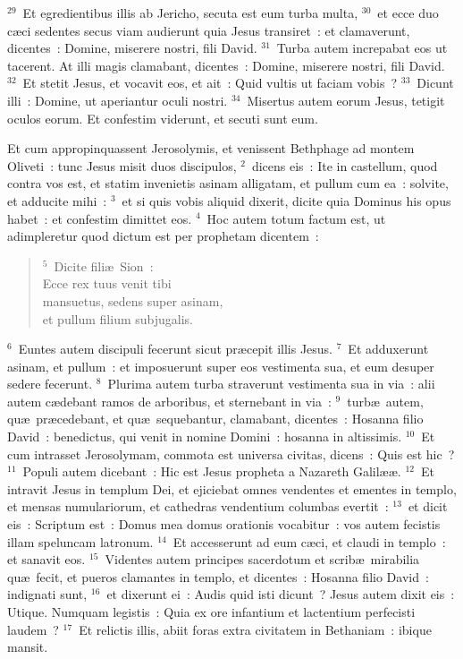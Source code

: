 ${}^{29}$~Et egredientibus illis ab Jericho, secuta est eum turba multa,
${}^{30}$~et ecce duo c\ae ci sedentes secus viam audierunt quia Jesus transiret~: et clamaverunt, dicentes~: Domine, miserere nostri, fili David.
${}^{31}$~Turba autem increpabat eos ut tacerent. At illi magis clamabant, dicentes~: Domine, miserere nostri, fili David.
${}^{32}$~Et stetit Jesus, et vocavit eos, et ait~: Quid vultis ut faciam vobis~?
${}^{33}$~Dicunt illi~: Domine, ut aperiantur oculi nostri.
${}^{34}$~Misertus autem eorum Jesus, tetigit oculos eorum. Et confestim viderunt, et secuti sunt eum.

\lettrine[lines=10,image=true,loversize=0.05,lraise=-0.03]{E}{}t cum appropinquassent Jerosolymis, et venissent Bethphage ad montem Oliveti~: tunc Jesus misit duos discipulos,
${}^{2}$~dicens eis~: Ite in castellum, quod contra vos est, et statim invenietis asinam alligatam, et pullum cum ea~: solvite, et adducite mihi~:
${}^{3}$~et si quis vobis aliquid dixerit, dicite quia Dominus his opus habet~: et confestim dimittet eos.
${}^{4}$~Hoc autem totum factum est, ut adimpleretur quod dictum est per prophetam dicentem~:
\begin{flushleft}\begin{verse}${}^{5}$~Dicite fili\ae\ Sion~:\\ Ecce rex tuus venit tibi\\ mansuetus, sedens super asinam,\\ et pullum filium subjugalis.\end{verse}\end{flushleft}


${}^{6}$~Euntes autem discipuli fecerunt sicut pr\ae cepit illis Jesus.
${}^{7}$~Et adduxerunt asinam, et pullum~: et imposuerunt super eos vestimenta sua, et eum desuper sedere fecerunt.
${}^{8}$~Plurima autem turba straverunt vestimenta sua in via~: alii autem c\ae debant ramos de arboribus, et sternebant in via~:
${}^{9}$~turb\ae\ autem, qu\ae\ pr\ae cedebant, et qu\ae\ sequebantur, clamabant, dicentes~: Hosanna filio David~: benedictus, qui venit in nomine Domini~: hosanna in altissimis.
${}^{10}$~Et cum intrasset Jerosolymam, commota est universa civitas, dicens~: Quis est hic~?
${}^{11}$~Populi autem dicebant~: Hic est Jesus propheta a Nazareth Galil\ae \ae .
${}^{12}$~Et intravit Jesus in templum Dei, et ejiciebat omnes vendentes et ementes in templo, et mensas numulariorum, et cathedras vendentium columbas evertit~:
${}^{13}$~et dicit eis~: Scriptum est~: Domus mea domus orationis vocabitur~: vos autem fecistis illam speluncam latronum.
${}^{14}$~Et accesserunt ad eum c\ae ci, et claudi in templo~: et sanavit eos.
${}^{15}$~Videntes autem principes sacerdotum et scrib\ae\ mirabilia qu\ae\ fecit, et pueros clamantes in templo, et dicentes~: Hosanna filio David~: indignati sunt,
${}^{16}$~et dixerunt ei~: Audis quid isti dicunt~? Jesus autem dixit eis~: Utique. Numquam legistis~: Quia ex ore infantium et lactentium perfecisti laudem~?
${}^{17}$~Et relictis illis, abiit foras extra civitatem in Bethaniam~: ibique mansit.


